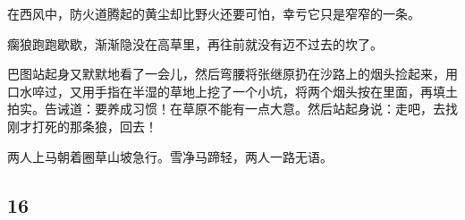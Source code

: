 \par 在西风中，防火道腾起的黄尘却比野火还要可怕，幸亏它只是窄窄的一条。
\par 瘸狼跑跑歇歇，渐渐隐没在高草里，再往前就没有迈不过去的坎了。
\par 巴图站起身又默默地看了一会儿，然后弯腰将张继原扔在沙路上的烟头捡起来，用口水啐过，又用手指在半湿的草地上挖了一个小坑，将两个烟头按在里面，再填土拍实。告诫道：要养成习惯！在草原不能有一点大意。然后站起身说：走吧，去找刚才打死的那条狼，回去！
\par 两人上马朝着圈草山坡急行。雪净马蹄轻，两人一路无语。
    



\subsection*{16}


